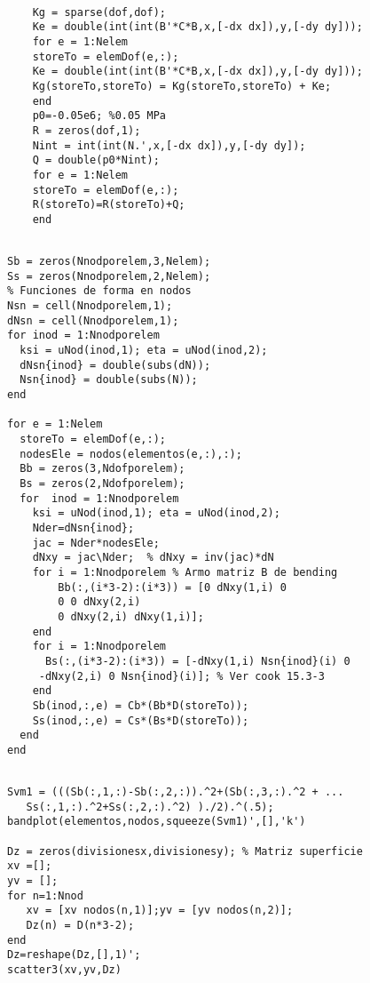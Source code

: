 \begin{code}
	\begin{verbatim}
	
	Kg = sparse(dof,dof);
	Ke = double(int(int(B'*C*B,x,[-dx dx]),y,[-dy dy]));
	for e = 1:Nelem
	storeTo = elemDof(e,:);
	Ke = double(int(int(B'*C*B,x,[-dx dx]),y,[-dy dy]));
	Kg(storeTo,storeTo) = Kg(storeTo,storeTo) + Ke;
	end
	p0=-0.05e6; %0.05 MPa
	R = zeros(dof,1);
	Nint = int(int(N.',x,[-dx dx]),y,[-dy dy]);
	Q = double(p0*Nint);
	for e = 1:Nelem 
	storeTo = elemDof(e,:);
	R(storeTo)=R(storeTo)+Q;
	end
	\end{verbatim}
\end{code}

\begin{code}
	\begin{verbatim}
	
Sb = zeros(Nnodporelem,3,Nelem);
Ss = zeros(Nnodporelem,2,Nelem);
% Funciones de forma en nodos
Nsn = cell(Nnodporelem,1);
dNsn = cell(Nnodporelem,1);
for inod = 1:Nnodporelem
  ksi = uNod(inod,1); eta = uNod(inod,2);
  dNsn{inod} = double(subs(dN));
  Nsn{inod} = double(subs(N));
end

for e = 1:Nelem
  storeTo = elemDof(e,:);
  nodesEle = nodos(elementos(e,:),:);
  Bb = zeros(3,Ndofporelem);
  Bs = zeros(2,Ndofporelem);
  for  inod = 1:Nnodporelem
    ksi = uNod(inod,1); eta = uNod(inod,2);
    Nder=dNsn{inod};
    jac = Nder*nodesEle;
    dNxy = jac\Nder;  % dNxy = inv(jac)*dN     
    for i = 1:Nnodporelem % Armo matriz B de bending
        Bb(:,(i*3-2):(i*3)) = [0 dNxy(1,i) 0
        0 0 dNxy(2,i)
        0 dNxy(2,i) dNxy(1,i)];
    end
    for i = 1:Nnodporelem 
      Bs(:,(i*3-2):(i*3)) = [-dNxy(1,i) Nsn{inod}(i) 0
     -dNxy(2,i) 0 Nsn{inod}(i)]; % Ver cook 15.3-3
    end
    Sb(inod,:,e) = Cb*(Bb*D(storeTo));
    Ss(inod,:,e) = Cs*(Bs*D(storeTo));
  end
end
	\end{verbatim}
\end{code}

\begin{code}
	\begin{verbatim}
	
Svm1 = (((Sb(:,1,:)-Sb(:,2,:)).^2+(Sb(:,3,:).^2 + ...
   Ss(:,1,:).^2+Ss(:,2,:).^2) )./2).^(.5);
bandplot(elementos,nodos,squeeze(Svm1)',[],'k')

Dz = zeros(divisionesx,divisionesy); % Matriz superficie
xv =[];
yv = [];
for n=1:Nnod
   xv = [xv nodos(n,1)];yv = [yv nodos(n,2)];
   Dz(n) = D(n*3-2);
end
Dz=reshape(Dz,[],1)';
scatter3(xv,yv,Dz)
	\end{verbatim}
\end{code}

